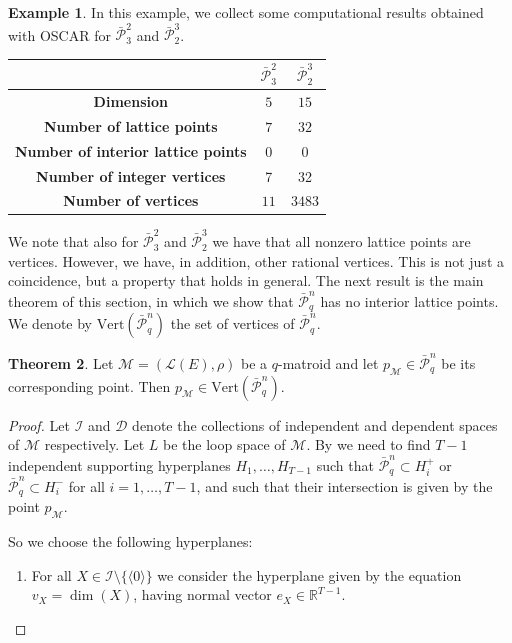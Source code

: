 \documentclass[a4paper,11pt,reqno]{amsart}
\theoremstyle{definition}
\newtheorem{theorem}{Theorem}[section]
\newtheorem{example}[theorem]{{{Example}}}
\newcommand{\mD}{\mathcal{D}}
\newcommand{\mM}{\mathcal{M}}
\newcommand{\mL}{\mathcal{L}}
\newcommand{\mI}{\mathcal{I}}
\newcommand{\la}{\langle}
\newcommand{\ra}{\rangle}
\newcommand{\rRP}{\bar{\mathcal{P}}_q^n}
\begin{document}
{\begin{example}
    In this example, we collect some computational results obtained with \textsc{OSCAR} for $\bar{\mathcal{P}}_3^2$ and $\bar{\mathcal{P}}_2^3$. 

    \begin{center}
        \begin{tabular}{c|c|c}
             & $\bar{\mathcal{P}}_3^2$ & $\bar{\mathcal{P}}_2^3$\\ \hline
             \textbf{Dimension} & $5$  & $15$  \\
             \textbf{Number of lattice points} & $7$  & $32$ \\
             \textbf{Number of interior lattice points} & $0$ & $0$  \\
             \textbf{Number of integer vertices} & 7 & 32\\ 
              \textbf{Number of vertices} & $11$ & $3483$ \\
        \end{tabular}
    \end{center}
\end{example}

We note that also for $\bar{\mathcal{P}}_3^2$ and $\bar{\mathcal{P}}_2^3$ we have that all nonzero lattice points are vertices. However,  we have, in addition, other rational vertices. This is not just a coincidence, but a property that holds in general. 
The next result is the main theorem of this section, in which we show that $\rRP$ has no interior lattice points. 
We denote by $\text{Vert}(\rRP)$ the set of vertices of $\rRP$.

\begin{theorem}\label{thm:integer_vertices}
    Let $\mM=(\mL(E),\rho)$ be a $q$-matroid and let $p_\mM\in\rRP$ be its corresponding point. Then $p_\mM\in\text{Vert}(\rRP)$. 
\end{theorem}

\begin{proof}
    Let $\mI$ and $\mD$ denote the collections of independent and dependent spaces of $\mM$ respectively. Let $L$ be the loop space of $\mM$. By  we need to find $T-1$ independent supporting hyperplanes $H_1,\ldots,H_{T-1}$ such that $\rRP\subset H_i^+$ or $\rRP\subset H_i^-$ for all $i=1,\ldots,T-1$, and such that their intersection is given by the point $p_\mM$.

    So we choose the following hyperplanes:
    \begin{enumerate}
        \item For all $X\in\mI\setminus\{\la0\ra\}$ we consider the hyperplane given by the equation $v_X=\dim(X)$, having normal vector $e_X\in\mathbb{R}^{T-1}$.


\end{enumerate}
\end{proof}}
\end{document}
